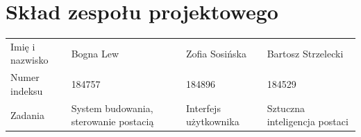 \section{Skład zespołu projektowego}
\begin{center}
  \begin{tabular}{ m{10em} m{10em} m{10em} m{10em} }
    Imię i nazwisko & Bogna Lew & Zofia Sosińska & Bartosz Strzelecki \\
    Numer indeksu & 184757 & 184896 & 184529 \\
    Zadania & System budowania, sterowanie postacią & Interfejs użytkownika & Sztuczna inteligencja postaci\\
  \end{tabular}
\end{center}
